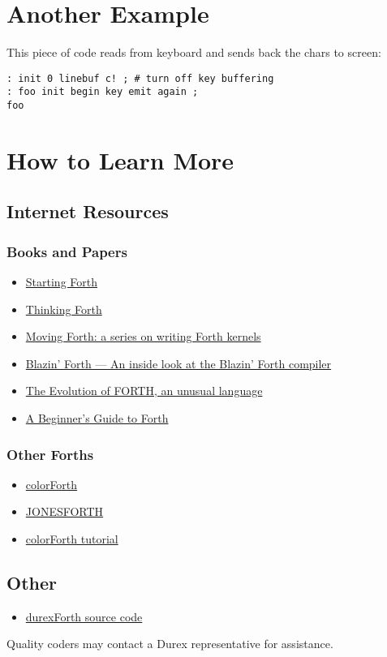 \section{Another Example}

This piece of code reads from keyboard and sends back the chars to screen:

\begin{verbatim}
: init 0 linebuf c! ; # turn off key buffering
: foo init begin key emit again ;
foo
\end{verbatim}

\section{How to Learn More}

\subsection{Internet Resources}

\subsubsection{Books and Papers}

\begin{itemize}
\item \href{http://www.forth.com/starting-forth/}{Starting Forth}
\item \href{http://thinking-forth.sourceforge.net/}{Thinking Forth}
\item \href{http://www.bradrodriguez.com/papers/}{Moving Forth: a series on writing Forth kernels}
\item \href{http://www.csbruce.com/~csbruce/cbm/transactor/v7/i5/p058.html}{Blazin' Forth --- An inside look at the Blazin' Forth compiler}
\item \href{http://dobbscodetalk.com/index.php?option=com_myblog&show=In-this-1980-article-from-Byte-Charles-Moore-recounts-the-creation-of-Forth..html&Itemid=29}{The Evolution of FORTH, an unusual language}
\item \href{http://galileo.phys.virginia.edu/classes/551.jvn.fall01/primer.htm}{A Beginner's Guide to Forth}
\end{itemize}

\subsubsection{Other Forths}

\begin{itemize}
\item \href{http://www.colorforth.com/cf.html}{colorForth}
\item \href{http://www.annexia.org/forth}{JONESFORTH}
\item \href{http://colorforthray.info/}{colorForth tutorial}
\end{itemize}

\subsection{Other}

\begin{itemize}
\item \href{http://code.google.com/p/durexforth/}{durexForth source code}
\end{itemize}

Quality coders may contact a Durex representative for assistance.
